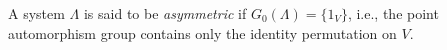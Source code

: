 A system $\Lambda$ is said to be \emph{asymmetric} if $G_0(\Lambda) = \{1_V\}$, i.e., the point automorphism group contains only the identity permutation on $V$.
